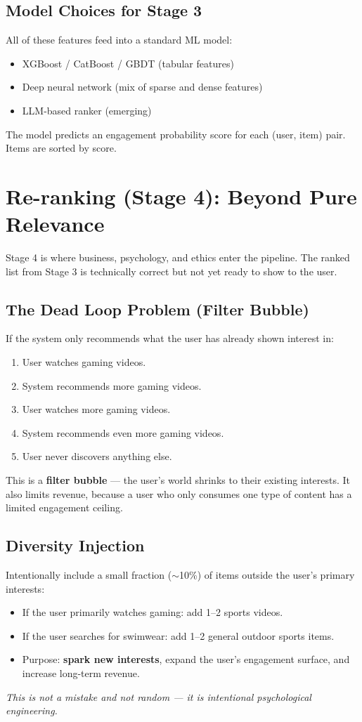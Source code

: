\documentclass[11pt]{article}
\begin{document}
\subsection{Model Choices for Stage 3}
All of these features feed into a standard ML model:
\begin{itemize}
    \item XGBoost / CatBoost / GBDT (tabular features)
    \item Deep neural network (mix of sparse and dense features)
    \item LLM-based ranker (emerging)
\end{itemize}
The model predicts an engagement probability score for each
(user, item) pair. Items are sorted by score.


\newpage
\section{Re-ranking (Stage 4): Beyond Pure Relevance}

Stage 4 is where business, psychology, and ethics enter the pipeline.
The ranked list from Stage 3 is technically correct but not yet ready
to show to the user.

\subsection{The Dead Loop Problem (Filter Bubble)}
If the system only recommends what the user has already shown interest in:
\begin{enumerate}
    \item User watches gaming videos.
    \item System recommends more gaming videos.
    \item User watches more gaming videos.
    \item System recommends even more gaming videos.
    \item User never discovers anything else.
\end{enumerate}
This is a \textbf{filter bubble} --- the user's world shrinks to their
existing interests. It also limits revenue, because a user who only
consumes one type of content has a limited engagement ceiling.

\subsection{Diversity Injection}
Intentionally include a small fraction ($\sim$10\%) of items outside the
user's primary interests:
\begin{itemize}
    \item If the user primarily watches gaming: add 1--2 sports videos.
    \item If the user searches for swimwear: add 1--2 general outdoor
      sports items.
    \item Purpose: \textbf{spark new interests}, expand the user's
      engagement surface, and increase long-term revenue.
\end{itemize}
\textit{This is not a mistake and not random --- it is intentional
psychological engineering.}
\end{document}
